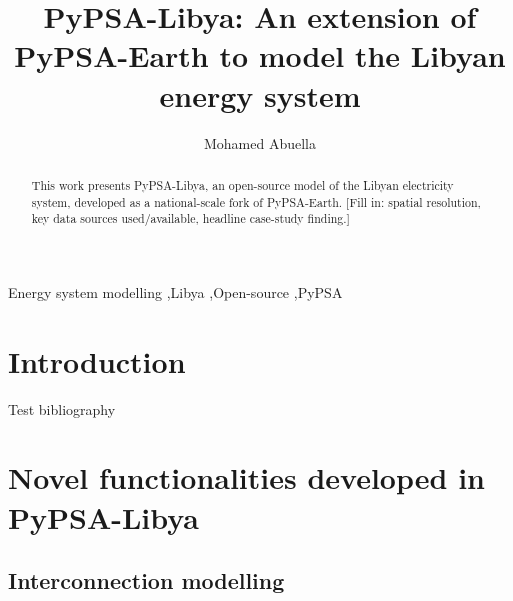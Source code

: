 \documentclass[preprint,12pt]{elsarticle}
\begin{document}
\begin{frontmatter}

\title{PyPSA-Libya: An extension of PyPSA-Earth to model the Libyan energy system}

\author[a]{Mohamed Abuella}


\begin{abstract}
This work presents PyPSA-Libya, an open-source model of the Libyan electricity
system, developed as a national-scale fork of PyPSA-Earth. [Fill in: spatial
resolution, key data sources used/available, headline case-study finding.]
\end{abstract}

\begin{keyword}
Energy system modelling \sep Libya \sep Open-source \sep PyPSA
\end{keyword}

\end{frontmatter}

\section{Introduction}


Test bibliography ~\cite{almaktar2021prospects, eljrushi1990solar, fakhreddine2025global, terlouw2022large, fattahi2024opportunities, abdelkhalek2025pypsa, gallego2025pypsaspain, johnson2025realistic, alanazi2025renewable, rahil2018techno, achhammer2026impact}


\section{Novel functionalities developed in PyPSA-Libya}

\subsection{Interconnection modelling}
\end{document}
